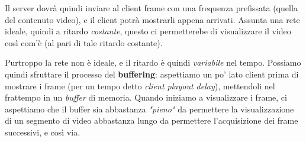 \documentclass[a4paper,11pt]{article}
\begin{document}
Il server dovrà quindi inviare al client frame con una frequenza prefissata (quella del contenuto video), e il client potrà mostrarli appena arrivati.
Assunta una rete ideale, quindi a ritardo \textit{costante}, questo ci permetterebe di visualizzare il video così com'è (al pari di tale ritardo costante).

Purtroppo la rete non è ideale, e il ritardo è quindi \textit{variabile} nel tempo.
Possiamo quindi sfruttare il processo del \textbf{buffering}: aspettiamo un po' lato client prima di mostrare i frame (per un tempo detto \textit{client playout delay}), mettendoli nel frattempo in un \textit{buffer} di memoria.
Quando iniziamo a visualizzare i frame, ci aspettiamo che il buffer sia abbastanza \textit{"pieno"} da permettere la visualizzazione di un segmento di video abbastanza lungo da permettere l'acquisizione dei frame successivi, e così via. 
\end{document}
